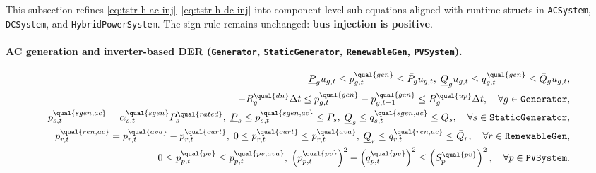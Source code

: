 This subsection refines \eqref{eq:tstr-h-ac-inj}--\eqref{eq:tstr-h-dc-inj} into
component-level sub-equations aligned with runtime structs in
\texttt{ACSystem}, \texttt{DCSystem}, and \texttt{HybridPowerSystem}.  The
sign rule remains unchanged: \textbf{bus injection is positive}.

\paragraph{AC generation and inverter-based DER (\texttt{Generator}, \texttt{StaticGenerator}, \texttt{RenewableGen}, \texttt{PVSystem}).}
\begin{align}
\underline P_g u_{g,t}\le p^{\qual{gen}}_{g,t}\le \bar P_g u_{g,t},\;
\underline Q_g u_{g,t}\le q^{\qual{gen}}_{g,t}\le \bar Q_g u_{g,t},
\label{eq:tstr-comp-gen}
\\
-R_g^{\qual{dn}}\Delta t \le p^{\qual{gen}}_{g,t}-p^{\qual{gen}}_{g,t-1}
\le R_g^{\qual{up}}\Delta t,
\quad \forall g\in\texttt{Generator},
\notag
\\
p^{\qual{sgen,ac}}_{s,t}=\alpha^{\qual{sgen}}_{s,t}P^{\qual{rated}}_s,\;
\underline P_s\le p^{\qual{sgen,ac}}_{s,t}\le \bar P_s,\;
\underline Q_s\le q^{\qual{sgen,ac}}_{s,t}\le \bar Q_s,
\quad \forall s\in\texttt{StaticGenerator},
\label{eq:tstr-comp-sgen-ac}
\\
p^{\qual{ren,ac}}_{r,t}=p^{\qual{ava}}_{r,t}-p^{\qual{curt}}_{r,t},\;
0\le p^{\qual{curt}}_{r,t}\le p^{\qual{ava}}_{r,t},\;
\underline Q_r\le q^{\qual{ren,ac}}_{r,t}\le \bar Q_r,
\quad \forall r\in\texttt{RenewableGen},
\label{eq:tstr-comp-ren}
\\
0\le p^{\qual{pv}}_{p,t}\le p^{\qual{pv,ava}}_{p,t},\;
\left(p^{\qual{pv}}_{p,t}\right)^2+\left(q^{\qual{pv}}_{p,t}\right)^2
\le \left(S^{\qual{pv}}_p\right)^2,
\quad \forall p\in\texttt{PVSystem}.
\label{eq:tstr-comp-pv}
\end{align}

